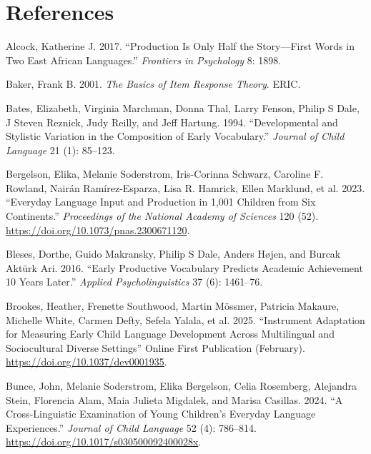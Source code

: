 \documentclass[
  letterpaper,
  DIV=11,
  numbers=noendperiod]{scrartcl}
\newlength{\cslhangindent}
\newenvironment{CSLReferences}[2] %
 {\begin{list}{}{%
  \setlength{\itemindent}{0pt}
  \setlength{\leftmargin}{0pt}
  \setlength{\parsep}{0pt}
  \ifodd #1
   \setlength{\leftmargin}{\cslhangindent}
   \setlength{\itemindent}{-1\cslhangindent}
  \fi
  \setlength{\itemsep}{#2\baselineskip}}}
 {\end{list}}
\begin{document}
\section{References}\label{references}

\label{refs}
\begin{CSLReferences}{1}{0}
Alcock, Katherine J. 2017. {``Production Is Only Half the Story---First
Words in Two {East African} Languages.''} \emph{Frontiers in Psychology}
8: 1898.

Baker, Frank B. 2001. \emph{The Basics of Item Response Theory}. ERIC.

Bates, Elizabeth, Virginia Marchman, Donna Thal, Larry Fenson, Philip S
Dale, J Steven Reznick, Judy Reilly, and Jeff Hartung. 1994.
{``Developmental and Stylistic Variation in the Composition of Early
Vocabulary.''} \emph{Journal of Child Language} 21 (1): 85--123.

Bergelson, Elika, Melanie Soderstrom, Iris-Corinna Schwarz, Caroline F.
Rowland, Nairán Ramírez-Esparza, Lisa R. Hamrick, Ellen Marklund, et al.
2023. {``Everyday Language Input and Production in 1,001 Children from
Six Continents.''} \emph{Proceedings of the National Academy of
Sciences} 120 (52). \url{https://doi.org/10.1073/pnas.2300671120}.

Bleses, Dorthe, Guido Makransky, Philip S Dale, Anders Højen, and Burcak
Aktürk Ari. 2016. {``Early Productive Vocabulary Predicts Academic
Achievement 10 Years Later.''} \emph{Applied Psycholinguistics} 37 (6):
1461--76.

Brookes, Heather, Frenette Southwood, Martin Mössmer, Patricia Makaure,
Michelle White, Carmen Defty, Sefela Yalala, et al. 2025. {``Instrument
Adaptation for Measuring Early Child Language Development Across
Multilingual and Sociocultural Diverse Settings''} Online First
Publication (February). \url{https://doi.org/10.1037/dev0001935}.

Bunce, John, Melanie Soderstrom, Elika Bergelson, Celia Rosemberg,
Alejandra Stein, Florencia Alam, Maia Julieta Migdalek, and Marisa
Casillas. 2024. {``A Cross-Linguistic Examination of Young Children's
Everyday Language Experiences.''} \emph{Journal of Child Language} 52
(4): 786--814. \url{https://doi.org/10.1017/s030500092400028x}.


\end{CSLReferences}
\end{document}
